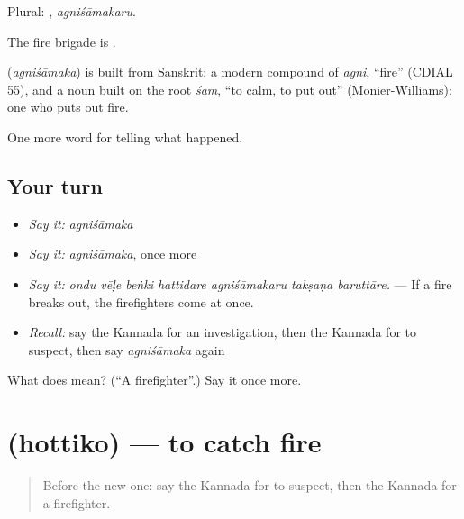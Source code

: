 Plural: , \emph{agniśāmakaru}.

The fire brigade is  .

\begin{cousinweb}
\textbf{} (\emph{agniśāmaka}) is built from Sanskrit: a modern compound of \emph{agni}, \textquotedblleft{}fire\textquotedblright{} (CDIAL 55), and a noun built on the root \emph{śam}, \textquotedblleft{}to calm, to put out\textquotedblright{} (Monier-Williams): one who puts out fire.
\end{cousinweb}

\begin{grammarlens}[title={What you've built}]
One more word for telling what happened.
\end{grammarlens}

\subsection*{Your turn}
\begin{itemize}
\raggedright
  \item \emph{Say it:} \emph{agniśāmaka}
  \item \emph{Say it:} \emph{agniśāmaka}, once more
  \item \emph{Say it:} \emph{ondu vēḷe beṅki hattidare agniśāmakaru takṣaṇa baruttāre.} — If a fire breaks out, the firefighters come at once.
  \item \emph{Recall:} say the Kannada for an investigation, then the Kannada for to suspect, then say \emph{agniśāmaka} again
\end{itemize}

\begin{tcolorbox}[breakable,colback=teal!4,colframe=teal!35!black,title={Before you move on}]
What does  mean? (\textquotedblleft{}A firefighter\textquotedblright{}.) Say it once more.
\end{tcolorbox}
\section[\texorpdfstring{\kn{ಹೊತ್ತಿಕೊ} (hottiko)}{ಹೊತ್ತಿಕೊ (hottiko)}]{ (hottiko) — to catch fire}

\label{lesson:KA-C324-hottiko}



\begin{quote}
Before the new one: say the Kannada for to suspect, then the Kannada for a firefighter.
\end{quote}

